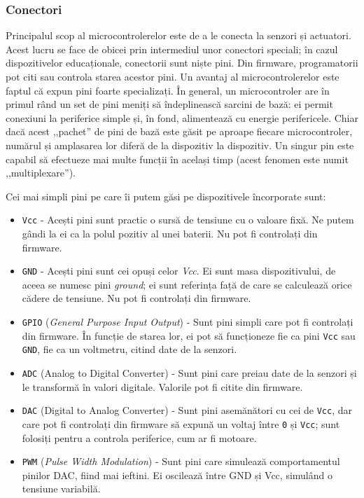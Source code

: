 \subsubsection{Conectori}
\label{sec:embed:micro-comp:micro:connect}

Principalul scop al microcontrolerelor este de a le conecta la senzori și
actuatori. Acest lucru se face de obicei prin intermediul unor conectori
speciali; în cazul dispozitivelor educaționale, conectorii sunt niște pini. Din
firmware, programatorii pot citi sau controla starea acestor pini. Un avantaj al
microcontrolerelor este faptul că expun pini foarte specializați. În
general, un microcontroler are în primul rând un set de pini meniți să
îndeplinească sarcini de bază: ei permit conexiuni la periferice simple și, în
fond, alimentează cu energie perifericele. Chiar dacă acest ,,pachet'' de pini de
bază este găsit pe aproape fiecare microcontroler, numărul și amplasarea lor
diferă de la dispozitiv la dispozitiv. Un singur pin este capabil să efectueze
mai multe funcții în același timp (acest fenomen este numit ,,multiplexare'').

Cei mai simpli pini pe care îi putem găsi pe dispozitivele încorporate sunt:

\begin{itemize}
  \item \texttt{Vcc} - Acești pini sunt practic o sursă de tensiune cu o valoare
		fixă. Ne putem gândi la ei ca la polul pozitiv al unei baterii.
		Nu pot fi controlați din firmware.
              \item \texttt{GND} - Acești pini sunt cei opuși celor \textit{Vcc}. Ei sunt masa
                dispozitivului, de aceea se numesc pini \textit{ground}; ei sunt
		referința față de care se calculează orice cădere de tensiune.
		Nu pot fi controlați din firmware.
              \item \texttt{GPIO}  (\textit{General Purpose
                Input Output}) - Sunt pini simpli care pot fi controlați din
		firmware. În funcție de starea lor, ei pot să funcționeze fie ca
                pini \texttt{Vcc} sau \texttt{GND}, fie ca un voltmetru, citind date de la senzori.
              \item \texttt{ADC}  (Analog to Digital
		Converter) - Sunt pini care preiau date de la senzori și le
		transformă în valori digitale. Valorile pot fi citite din
		firmware.
              \item \texttt{DAC}  (Digital to Analog
                Converter) - Sunt pini asemănători cu cei de \texttt{Vcc}, dar care pot
                fi controlați din firmware să expună un voltaj între \texttt{0} și \texttt{Vcc};
		sunt folosiți pentru a controla periferice, cum ar fi motoare.
              \item \texttt{PWM}  (\textit{Pulse Width Modulation})
		- Sunt pini care simulează comportamentul pinilor DAC, fiind mai
		ieftini. Ei oscilează între GND și Vcc, simulând o tensiune
		variabilă.
\end{itemize}


